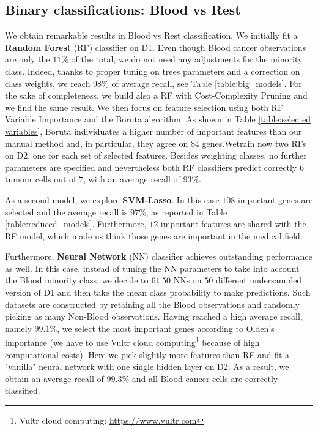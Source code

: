 \documentclass[a4paper,11pt, oneside]{article}  %
\begin{document}
\subsection{Binary classifications: Blood vs Rest}
We obtain remarkable results in Blood vs Rest classification. We initially fit a \textbf{Random Forest} (RF) classifier on D1. Even though Blood cancer observations are only the $11\%$ of the total,  we do not need any adjustments for the minority class.  Indeed, thanks to proper tuning on trees parameters and a correction on class weights, we reach $98\%$ of average recall,  see Table \ref{table:big_models}. For the sake of completeness, we build also a RF with Cost-Complexity Pruning and we find the same result. We then focus on feature selection using both RF Variable Importance and the Boruta algorithm. As shown in Table \ref{table:selected variables},  Boruta individuates a higher number of important features than our manual method and,  in particular,  they agree on $84$ genes.Wetrain now two RFs on D2, one for each set of selected features. Besides weighting classes, no further parameters are specified and nevertheless both RF classifiers predict correctly $6$ tumour cells out of $7$,  with an average recall of $93\%$.

As a second model, we explore \textbf{SVM-Lasso}. In this case $108$ important genes are selected and the average recall is $97\%$, as reported in Table \ref{table:reduced_models}. Furthermore, $12$ important features are shared with the RF model, which made us think those genes are important in the medical field.

Furthermore, \textbf{Neural Network} (NN) classifier achieves outstanding performance as well.  In this case,  instead of tuning the NN parameters to take into account the Blood minority class,  we decide to fit $50$ NNs on $50$ different undersampled version of D1 and then take the mean class probability to make predictions. Such datasets are constructed by retaining all the Blood observations and randomly picking as many Non-Blood observations.  Having reached a high average recall, namely $99.1\%$,  we select the most important genes according to Olden's importance (we have to use Vultr cloud computing\footnote{Vultr cloud computing: \url{https://www.vultr.com}} because of high computational costs). Here we pick slightly more features than RF and fit a "vanilla" neural network with one single hidden layer on D2.  As a result, we obtain an average recall of $99.3\%$ and all Blood cancer cells are correctly classified. 
\end{document}
